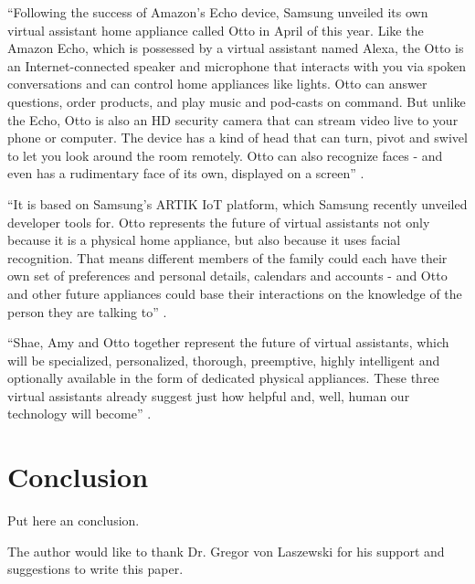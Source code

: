``Following the success of Amazon's Echo device, Samsung unveiled its own virtual assistant home appliance called Otto in April of this year. Like the Amazon Echo, which is possessed by a virtual assistant named Alexa, the Otto is an Internet-connected speaker and microphone that interacts with you via spoken conversations and can control home appliances like lights. Otto can answer questions, order products, and play music and pod-casts on command. But unlike the Echo, Otto is also an HD security camera that can stream video live to your phone or computer. The device has a kind of head that can turn, pivot and swivel to let you look around the room remotely. Otto can also recognize faces - and even has a rudimentary face of its own, displayed on a screen'' \cite{Elgan2016future}.

``It is based on Samsung's ARTIK IoT platform, which Samsung recently unveiled developer tools for. Otto represents the future of virtual assistants not only because it is a physical home appliance, but also because it uses facial recognition. That means different members of the family could each have their own set of preferences and personal details, calendars and accounts - and Otto and other future appliances could base their interactions on the knowledge of the person they are talking to'' \cite{Elgan2016future}.

``Shae, Amy and Otto together represent the future of virtual assistants, which will be specialized, personalized, thorough, preemptive, highly intelligent and optionally available in the form of dedicated physical appliances. These three virtual assistants already suggest just how helpful and, well, human our technology will become'' \cite{Elgan2016future}.









\section{Conclusion}

Put here an conclusion. 

\begin{acks}

  The author would like to thank Dr. Gregor von Laszewski for his
  support and suggestions to write this paper.

\end{acks}


 